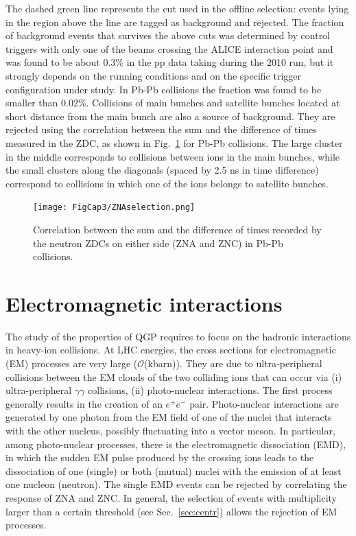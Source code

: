 The dashed green line represents the cut used in the offline selection: 
events lying in the region above the line are tagged as background and rejected.
The fraction of background events that survives the above cuts was determined
by control triggers with only one of the beams crossing the ALICE 
interaction point and was found to be about 0.3\% in the pp data taking 
during the 2010 run, but it strongly depends 
on the running conditions and on the specific trigger configuration under study. 
In Pb-Pb collisions the fraction was found to be smaller than 0.02\%.
Collisions of main bunches and satellite bunches located at short 
distance from the main bunch are also a source of background. 
They are rejected using the correlation between the sum and the difference 
of times measured in the ZDC, as shown in Fig.~\ref{fig:ZNAselection} for Pb-Pb collisions.
The large cluster in the middle corresponds to collisions between ions 
in the main bunches, while the small clusters along the diagonals (spaced by 
2.5 ns in time difference) correspond to collisions in which one of the ions belongs
to satellite bunches.
\begin{figure}[!h]
\centering
\texttt{[image: FigCap3/ZNAselection.png]}
\caption{Correlation between the sum and the difference of times recorded by the neutron ZDCs on either side (ZNA and ZNC) in Pb-Pb collisions. }
\label{fig:ZNAselection}
\end{figure}

\section{Electromagnetic interactions}
\label{sec:EMB}
The study of the properties of QGP requires to focus on the hadronic interactions in heavy-ion collisions.
At LHC energies, the cross sections for electromagnetic (EM) processes are very large ($\mathcal{O}$(kbarn)).
They are due to ultra-peripheral collisions between the EM clouds of the two colliding ions that can occur via 
(i) ultra-peripheral $\gamma \gamma$ collisions, (ii) photo-nuclear interactions.
The first process generally results in the creation of an $e^+e^-$ pair.
Photo-nuclear interactions are generated by one photon from the EM field of one of the nuclei
that interacts with the other nucleus, possibly fluctuating into a vector meson. 
In particular, among photo-nuclear processes, there is the electromagnetic dissociation (EMD), in which the sudden EM pulse
produced by the crossing ions leads to the dissociation of one (single) or both (mutual) nuclei
with the emission of at least one nucleon (neutron).
The single EMD events can be rejected by correlating the response of ZNA and ZNC.
In general, the selection of events with multiplicity larger than a certain threshold (see Sec.~\ref{sec:centr})
allows the rejection of EM processes.

